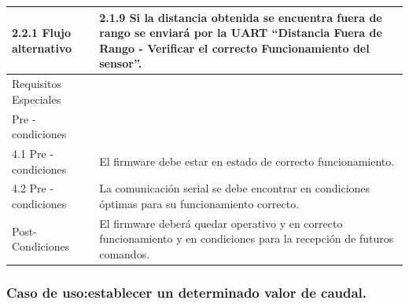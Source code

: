 \begin{table}[htpb]
\begin{center}
\begin{tabular}{ | m{4cm} | m{9.5cm} | }
2.2.1 Flujo alternativo  & 
2.1.9 Si la distancia obtenida se encuentra fuera de rango se enviará por la UART “Distancia Fuera de Rango - Verificar el correcto Funcionamiento del  sensor”. \\ \hline

Requisitos Especiales & \\ \hline


Pre - condiciones & \\ \hline
 
4.1 Pre - condiciones & 
El firmware debe estar en estado de correcto funcionamiento. \\ \hline

4.2 Pre - condiciones &
La comunicación serial se debe encontrar en condiciones óptimas para su funcionamiento correcto. \\ \hline

Post- Condiciones &
El firmware deberá quedar operativo y en correcto 
funcionamiento y en condiciones para la recepción de futuros comandos. \\ \hline

\end{tabular}

\label{tab:coches}
\end{center}
\end{table}

\subsubsection{Caso de uso:establecer un determinado valor de caudal.}

